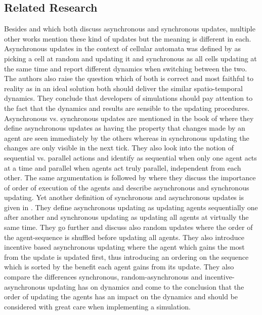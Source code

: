 \subsection{Related Research}
Besides \cite{nowak_evolutionary_1992} and \cite{huberman_evolutionary_1993} which both discuss asynchronous and synchronous updates, multiple other works mention these kind of updates but the meaning is different in each.
Asynchronous updates in the context of cellular automata was defined by \cite{bersini_asynchrony_1994} as picking a cell at random and updating it and synchronous as all cells updating at the same time and report different dynamics when switching between the two. The authors also raise the question which of both is correct and most faithful to reality as in an ideal solution both should deliver the similar spatio-temporal dynamics. They conclude that developers of simulations should pay attention to the fact that the dynamics and results are sensible to the updating procedures.
Asynchronous vs. synchronous updates are mentioned in the book of \cite{wilensky_introduction_2015} where they define asynchronous updates as having the property that changes made by an agent are seen immediately by the others whereas in synchronous updating the changes are only visible in the next tick. They also look into the notion of sequential vs. parallel actions and identify as sequential when only one agent acts at a time and parallel when agents act truly parallel, independent from each other. The same argumentation is followed by \cite{railsback_agent-based_2011} where they  discuss the importance of order of execution of the agents and describe asynchronous and synchronous updating.
Yet another definition of synchronous and asynchronous updates is given in \cite{page_incentives_1997}. They define asynchronous updating as updating agents sequentially one after another and synchronous updating as updating all agents at virtually the same time. They go further and discuss also random updates where the order of the agent-sequence is shuffled before updating all agents. They also introduce 
incentive based asynchronous updating where the agent which gains the most from the update is updated first, thus introducing an ordering on the sequence which is sorted by the benefit each agent gains from its update. They also compare the differences synchronous, random-asynchronous and incentive-asynchronous updating has on dynamics and come to the conclusion that the order of updating the agents has an impact on the dynamics and should be considered with great care when implementing a simulation.
